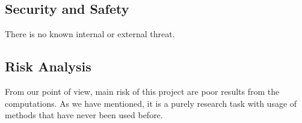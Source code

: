\documentclass{article}
\begin{document}

%
%
\subsection{Security and Safety}
There is no known internal or external threat.


\subsection{Risk Analysis}


From our point of view, main risk of this project are poor results from the computations. As we have mentioned, it is a purely research task with usage of methods that have never been used before. 
\end{document}
